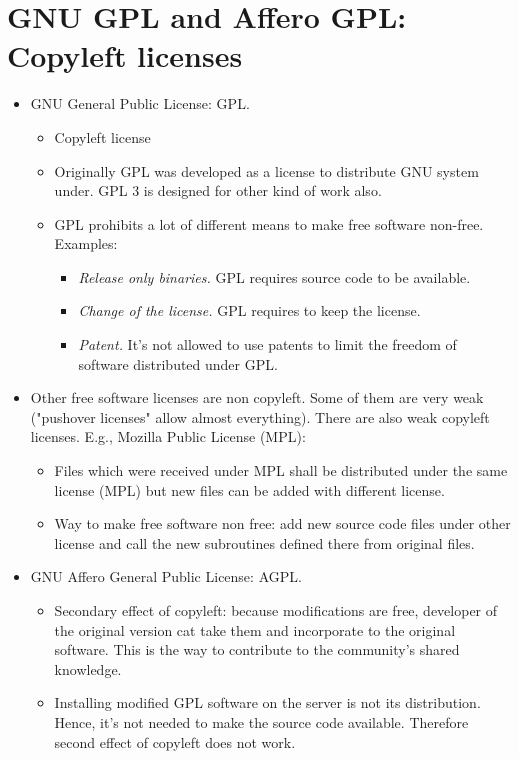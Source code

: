\documentclass[twoside,openright]{report}
\begin{document}
\section{GNU GPL and Affero GPL: Copyleft licenses}
\begin{itemize}
 \item     GNU General Public License: GPL.
\begin{itemize}
 \item         Copyleft license
 \item         Originally GPL was developed as a license to distribute GNU system under. GPL 3 is designed for other kind of work also.
 \item         GPL prohibits a lot of different means to make free software non-free. Examples:
\begin{itemize}
 \item             \emph{Release only binaries.} GPL requires source code to be available.
 \item             \emph{Change of the license.} GPL requires to keep the license.
 \item             \emph{Patent.} It's not allowed to use patents to limit the freedom of software distributed under GPL.
\end{itemize}
\end{itemize}
 \item     Other free software licenses are non copyleft. Some of them are very weak ("pushover licenses" allow almost everything). There are also weak copyleft licenses. E.g., Mozilla Public License (MPL):
\begin{itemize}
 \item         Files which were received under MPL shall be distributed under the same license (MPL) but new files can be added with different license.
 \item         Way to make free software non free: add new source code files under other license and call the new subroutines defined there from original files.
\end{itemize}
 \item     GNU Affero General Public License: AGPL.
\begin{itemize}
 \item         Secondary effect of copyleft: because modifications are free, developer of the original version cat take them and incorporate to the original software. This is the way to contribute to the community's shared knowledge.
 \item         Installing modified GPL software on the server is not its distribution. Hence, it's not needed to make the source code available. Therefore second effect of copyleft does not work.

\end{itemize}
\end{itemize}
\end{document}
